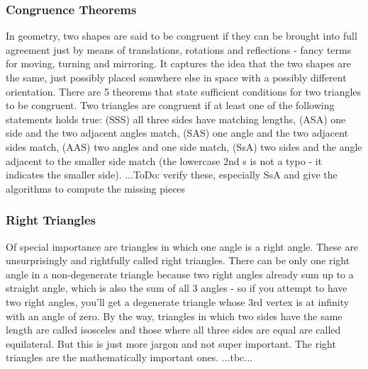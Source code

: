 
\subsubsection{Congruence Theorems}
In geometry, two shapes are said to be congruent if they can be brought into full agreement just by means of translations, rotations and reflections - fancy terms for moving, turning and mirroring. It captures the idea that the two shapes are the same, just possibly placed somwhere else in space with a possibly different orientation. There are 5 theorems that state sufficient conditions for two triangles to be congruent. Two triangles are congruent if at least one of the following statements holds true: (SSS) all three sides have matching lengths, (ASA) one side and the two adjacent angles match, (SAS) one angle and the two adjacent sides match, (AAS) two angles and one side match, (SsA) two sides and the angle adjacent to the smaller side match (the lowercase 2nd s is not a typo - it indicates the smaller side). ...ToDo: verify these, especially SsA and give the algorithms to compute the missing pieces




\subsubsection{Right Triangles}
Of special importance are triangles in which one angle is a right angle. These are unsurprisingly and rightfully called right triangles. There can be only one right angle in a non-degenerate triangle because two right angles already sum up to a straight angle, which is also the sum of all 3 angles - so if you attempt to have two right angles, you'll get a degenerate triangle whose 3rd vertex is at infinity with an angle of zero. By the way, triangles in which two sides have the same length are called isosceles and those where all three sides are equal are called equilateral. But this is just more jargon and not super important. The right triangles are the mathematically important ones. ...tbc...

